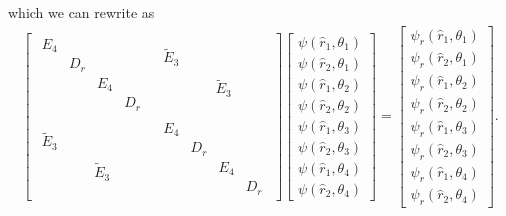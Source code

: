 which we can rewrite as
\begin{align*}
 \left[
 \begin{array}{c|c}
  \begin{array}{cccc}
   E_4 &     &     & \\
       & D_r &     & \\
       &     & E_4 & \\
       &     &     & D_r
  \end{array}
  &
  \begin{array}{cccc}
   \tilde{E}_3 & \quad &             & \quad \\
               & \quad &             & \quad \\
               & \quad & \tilde{E}_3 & \quad \\
               & \quad &             & \quad
  \end{array}
  \\ \hline
  \begin{array}{cccc}
   \tilde{E}_3 & \quad &             & \quad \\
               & \quad &             & \quad \\
               & \quad & \tilde{E}_3 & \quad \\
               & \quad &             & \quad
  \end{array}
  &
  \begin{array}{cccc}
   E_4 &     &     & \\
       & D_r &     & \\
       &     & E_4 & \\
       &     &     & D_r
  \end{array}
 \end{array}
 \right]
 \begin{bmatrix}
  \psi(\hat{r}_1,\theta_1) \\
  \psi(\hat{r}_2,\theta_1) \\
  \psi(\hat{r}_1,\theta_2) \\
  \psi(\hat{r}_2,\theta_2) \\ \hline
  \psi(\hat{r}_1,\theta_3) \\
  \psi(\hat{r}_2,\theta_3) \\
  \psi(\hat{r}_1,\theta_4) \\
  \psi(\hat{r}_2,\theta_4)
 \end{bmatrix}
 =
 \begin{bmatrix}
  \psi_r(\hat{r}_1,\theta_1) \\
  \psi_r(\hat{r}_2,\theta_1) \\
  \psi_r(\hat{r}_1,\theta_2) \\
  \psi_r(\hat{r}_2,\theta_2) \\ \hline
  \psi_r(\hat{r}_1,\theta_3) \\
  \psi_r(\hat{r}_2,\theta_3) \\
  \psi_r(\hat{r}_1,\theta_4) \\
  \psi_r(\hat{r}_2,\theta_4)
 \end{bmatrix}.
\end{align*}
